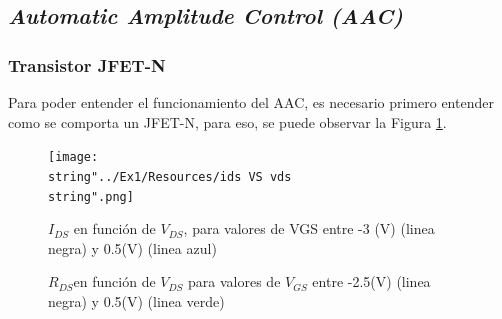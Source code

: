 \subsection{\emph{Automatic Amplitude Control (AAC)\label{subsec:Automatic-Amplitude-Control}}}

\subsubsection{Transistor JFET-N}

Para poder entender el funcionamiento del AAC, es necesario primero
entender como se comporta un JFET-N, para eso, se puede observar la
Figura \ref{1_4}.

\begin{figure}[H]
\begin{centering}
\texttt{[image: \\string"../Ex1/Resources/ids VS vds\\string".png]}
\par\end{centering}
\caption{$I_{DS}$ en función de $V_{DS}$, para valores de VGS entre -3 (V)
(linea negra) y 0.5(V) (linea azul) }
\label{1_4}

\end{figure}

\begin{figure}[H]
\begin{centering}
\par\end{centering}
\caption{$R_{DS}$en función de $V_{DS}$ para valores de $V_{GS}$ entre -2.5(V)
(linea negra) y 0.5(V) (linea verde)}
\label{1_5}

\end{figure}


